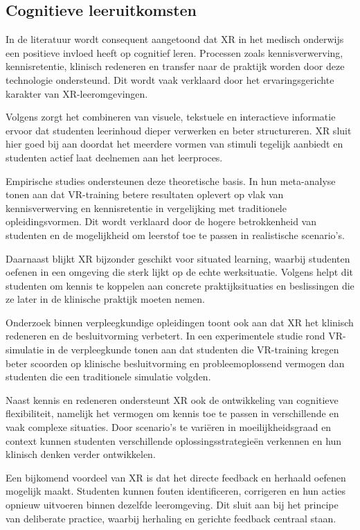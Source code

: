 \subsection{Cognitieve leeruitkomsten}

In de literatuur wordt consequent aangetoond dat XR in het medisch onderwijs een positieve invloed heeft op cognitief leren. Processen zoals kennisverwerving, kennisretentie, klinisch redeneren en transfer naar de praktijk worden door deze technologie ondersteund. Dit wordt vaak verklaard door het ervaringsgerichte karakter van XR-leeromgevingen.

Volgens \textcite{Mayer2009Multimedia} zorgt het combineren van visuele, tekstuele en interactieve informatie ervoor dat studenten leerinhoud dieper verwerken en beter structureren. XR sluit hier goed bij aan doordat het meerdere vormen van stimuli tegelijk aanbiedt en studenten actief laat deelnemen aan het leerproces.

Empirische studies ondersteunen deze theoretische basis. In hun meta-analyse tonen \textcite{Kyaw2019VR} aan dat VR-training betere resultaten oplevert op vlak van kennisverwerving en kennisretentie in vergelijking met traditionele opleidingsvormen. Dit wordt verklaard door de hogere betrokkenheid van studenten en de mogelijkheid om leerstof toe te passen in realistische scenario’s.

Daarnaast blijkt XR bijzonder geschikt voor situated learning, waarbij studenten oefenen in een omgeving die sterk lijkt op de echte werksituatie. Volgens \textcite{Fowler2015VR} helpt dit studenten om kennis te koppelen aan concrete praktijksituaties en beslissingen die ze later in de klinische praktijk moeten nemen.

Onderzoek binnen verpleegkundige opleidingen toont ook aan dat XR het klinisch redeneren en de besluitvorming verbetert. In een experimentele studie rond VR-simulatie in de verpleegkunde tonen \textcite{Padilha2019VR} aan dat studenten die VR-training kregen beter scoorden op klinische besluitvorming en probleemoplossend vermogen dan studenten die een traditionele simulatie volgden.

Naast kennis en redeneren ondersteunt XR ook de ontwikkeling van cognitieve flexibiliteit, namelijk het vermogen om kennis toe te passen in verschillende en vaak complexe situaties. Door scenario’s te variëren in moeilijkheidsgraad en context kunnen studenten verschillende oplossingsstrategieën verkennen en hun klinisch denken verder ontwikkelen.

Een bijkomend voordeel van XR is dat het directe feedback en herhaald oefenen mogelijk maakt. Studenten kunnen fouten identificeren, corrigeren en hun acties opnieuw uitvoeren binnen dezelfde leeromgeving. Dit sluit aan bij het principe van deliberate practice, waarbij herhaling en gerichte feedback centraal staan.

